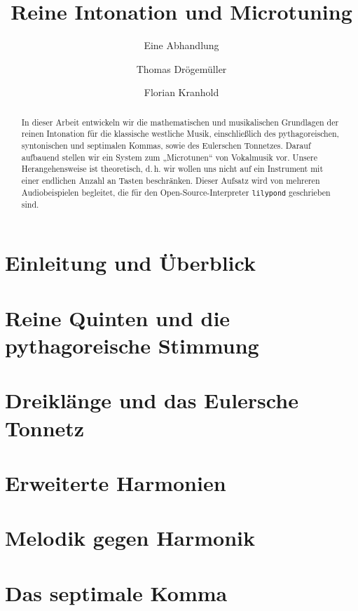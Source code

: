 \documentclass[ngerman,11pt]{scrartcl}
\title     {Reine Intonation und Microtuning}
\author    {Thomas Drögemüller\and Florian Kranhold}
\subtitle  {Eine Abhandlung}
\begin{document}
\maketitle

\begin{abstract}
  In dieser Arbeit entwickeln wir die mathematischen und musikalischen
  Grundlagen der reinen Intonation für die klassische westliche Musik,
  einschließlich des pythagoreischen, syntonischen und septimalen Kommas, sowie
  des Eulerschen Tonnetzes. Darauf aufbauend stellen wir ein System zum
  „Microtunen“ von Vokalmusik vor. Unsere Herangehensweise ist theoretisch,
  d.\,h. wir wollen uns nicht auf ein Instrument mit einer endlichen Anzahl an
  Tasten beschränken. Dieser Aufsatz wird von mehreren Audiobeispielen
  begleitet, die für den Open-Source-Interpreter \texttt{lilypond} geschrieben
  sind.
\end{abstract}

\section{Einleitung und Überblick}
\label{sec:int}


\section{Reine Quinten und die pythagoreische Stimmung}
\label{sec:pyth}


\section{Dreiklänge und das Eulersche Tonnetz}
\label{sec:tri}


\section{Erweiterte Harmonien}
\label{sec:quad}


\section{Melodik gegen Harmonik}


\section{Das septimale Komma}
\label{sec:sept}


\printbibliography[heading=bibintoc]
\end{document}
